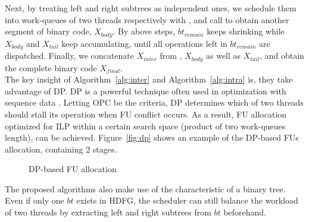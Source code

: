 Next, by treating left and right subtrees as independent ones, 
we schedule them into work-queues of two threads respectively with ,
and call  to obtain another segment of binary code, $X_{body}$.
By above steps, $bt_{remain}$ keeps shrinking while $X_{body}$ and $X_{tail}$ keep accumulating,
until all operations left in $bt_{remain}$ are dispatched.
Finally, we concatenate $X_{inter}$ from , $X_{body}$ as well as $X_{tail}$,
and obtain the complete binary code $X_{final}$.
\\\indent
The key insight of Algorithm~\ref{alg:inter} and Algorithm~\ref{alg:intra} is, they take advantage of DP.
DP is a powerful technique often used in optimization with sequence data \cite{dpseq}.
Letting OPC be the criteria, DP determines which of two threads should stall its operation when FU conflict occurs.
As a result, FU allocation optimized for ILP within a certain search space (product of two work-queues length), can be achieved.
Figure~\ref{fig:dp} shows an example of the DP-based FUs allocation, containing 2 stages.

\vspace{\textfig}
\begin{figure}[!ht]
    \begin{center}
        \hfill
    \end{center}
    \caption{DP-based FU allocation}
    \label{fig:alloc}
\end{figure}

\indent
The proposed algorithms also make use of the characteristic of a binary tree. 
Even if only one $bt$ exists in HDFG, 
the scheduler can still balance the workload of two threads by extracting left and right subtrees from $bt$ beforehand.



